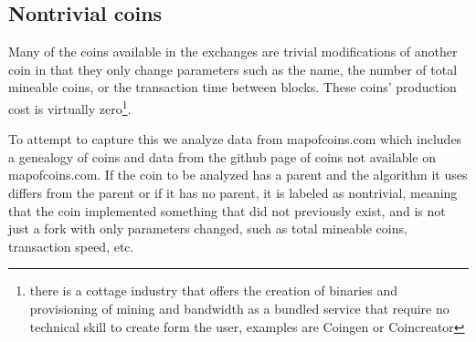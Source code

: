 \subsection{Nontrivial coins}

Many of the coins available in the exchanges are trivial modifications of another coin in that they only change parameters such as the name, the number of total mineable coins, or the transaction time between blocks.
These coins' production cost is virtually zero\footnote{ there is a cottage industry that offers the creation of binaries and provisioning of mining and bandwidth as a bundled service that require no technical skill to create form the user, examples are Coingen or Coincreator}.

To attempt to capture this we analyze data from mapofcoins.com which includes a genealogy of coins and data from the github page of coins not available on mapofcoins.com.
If the coin to be analyzed has a parent and the algorithm it uses differs from the parent or if it has no parent, it is labeled as nontrivial, meaning that the coin implemented something that did not previously exist, and is not just a fork with only parameters changed, such as total mineable coins, transaction speed, etc.
